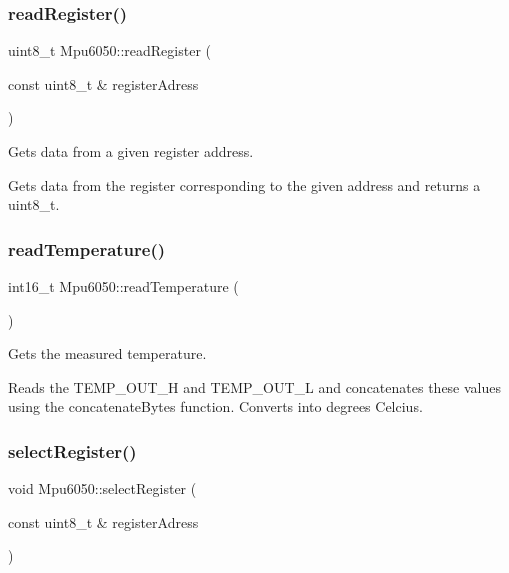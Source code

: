\subsubsection{\texorpdfstring{read\+Register()}{readRegister()}}
{\footnotesize\ttfamily uint8\+\_\+t Mpu6050\+::read\+Register (\begin{DoxyParamCaption}\item[{const uint8\+\_\+t \&}]{register\+Adress }\end{DoxyParamCaption})\hspace{0.3cm}{\ttfamily [virtual]}}



Gets data from a given register address. 

Gets data from the register corresponding to the given address and returns a uint8\+\_\+t. \mbox{\label{classMpu6050_ad34c38e7656bfab491ebc1a9f8b21a6b}} 
\subsubsection{\texorpdfstring{read\+Temperature()}{readTemperature()}}
{\footnotesize\ttfamily int16\+\_\+t Mpu6050\+::read\+Temperature (\begin{DoxyParamCaption}{ }\end{DoxyParamCaption})\hspace{0.3cm}{\ttfamily [virtual]}}



Gets the measured temperature. 

Reads the T\+E\+M\+P\+\_\+\+O\+U\+T\+\_\+H and T\+E\+M\+P\+\_\+\+O\+U\+T\+\_\+L and concatenates these values using the concatenate\+Bytes function. Converts into degrees Celcius. \mbox{\label{classMpu6050_a2ea5f53f3c5afec1c2a0fe55bf028599}} 
\subsubsection{\texorpdfstring{select\+Register()}{selectRegister()}}
{\footnotesize\ttfamily void Mpu6050\+::select\+Register (\begin{DoxyParamCaption}\item[{const uint8\+\_\+t \&}]{register\+Adress }\end{DoxyParamCaption})\hspace{0.3cm}{\ttfamily [virtual]}}



